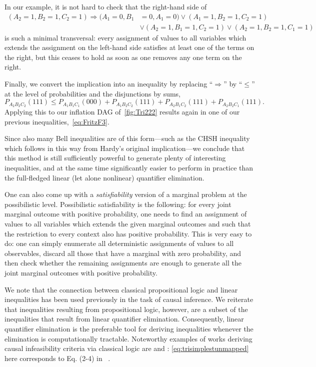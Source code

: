 In our example, it is not hard to check that the right-hand side of
\begin{align*}
	(A_2 = 1, B_2 = 1, C_2 = 1) \Longrightarrow (A_1 = 0, B_1 & = 0, A_1 = 0) \lor (A_1 = 1, B_2 = 1, C_2 = 1) \\
		& \lor (A_2 = 1, B_1 = 1, C_2 = 1) \lor (A_2 = 1, B_2 = 1, C_1 = 1)
\end{align*}
is such a minimal transversal: every assignment of values to all variables which extends the assignment on the left-hand side satisfies at least one of the terms on the right, but this ceases to hold as soon as one removes any one term on the right.

Finally, we convert the implication into an inequality by replacing ``$\Rightarrow$'' by ``$\leq$'' at the level of probabilities and the disjunctions by sums,
\[
	P_{A_2 B_2 C_2}(111) \leq P_{A_1 B_1 C_1}(000) + P_{A_1 B_2 C_2}(111) + P_{A_2 B_1 C_2}(111) + P_{A_2 B_2 C_1}(111).
\]
Applying this to our inflation DAG of~\cref{fig:Tri222} results again in one of our previous inequalities,~\cref{eq:FritzF3}.

Since also many Bell inequalities are of this form---such as the CHSH inequality which follows in this way from Hardy's original implication---we conclude that this method is still sufficiently powerful to generate plenty of interesting inequalities, and at the same time significantly easier to perform in practice than the full-fledged linear (let alone nonlinear) quantifier elimination.

One can also come up with a \emph{satisfiability} version of a marginal problem at the possibilistic level. Possibilistic satisfiability is the following: for every joint marginal outcome with positive probability, one needs to find an assignment of values to all variables which extends the given marginal outcomes and such that the restriction to every context also has positive probability. This is very easy to do: one can simply enumerate all deterministic assignments of values to all observables, discard all those that have a marginal with zero probability, and then check whether the remaining assignments are enough to generate all the joint marginal outcomes with positive probability.

We note that the connection between classical propositional logic and linear inequalities has been used previously in the task of causal inference. We reiterate that inequalities resulting from propositional logic, however, are a subset of the inequalities that result from linear quantifier elimination. Consequently, linear quantifier elimination is the preferable tool for deriving inequalities whenever the elimination is computationally tractable. Noteworthy examples of works deriving causal infeasibility criteria via classical logic are \citet{Pitowsky1989} and \citet{Ghirardi08}: \cref{eq:trisimplestunmapped} here corresponds to Eq. (2-4) in~\cite{Pitowsky1989}%
.






